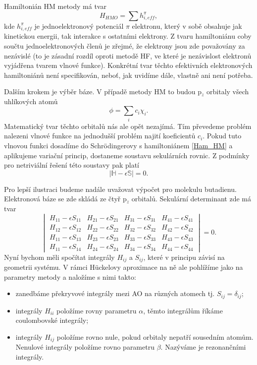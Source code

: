 Hamiltonián HM metody má tvar
\begin{equation}
H_{HMO}= \sum h_{i, eff}^\pi,
\label{rov:Ham_HM}
\end{equation}
kde $h_{i, eff}^\pi$ je jednoelektronový potenciál $\pi$ elektronu, který v sobě obsahuje jak kinetickou energii, tak interakce s ostatními elektrony.
Z tvaru hamiltoniánu coby součtu jednoelektronových členů je zřejmé, že elektrony jsou zde považovány za nezávislé (to je zásadní rozdíl oproti metodě HF, ve které je nezávislost elektronů vyjádřena  tvarem vlnové funkce). 
Konkrétní tvar těchto efektivních elektronových hamiltoniánů není specifikován, neboť, jak uvidíme dále, vlastně ani není potřeba. 

Dalším krokem je výběr báze. V případě metody HM to budou p$_z$ orbitaly všech uhlíkových atomů
\begin{equation}
\phi= \sum_i c_i \chi_i.
\label{rov:HM_MO}
\end{equation}
Matematický tvar těchto orbitalů nás ale opět nezajímá. Tím převedeme problém nalezeni vlnové funkce na jednodušší problém najití koeficientů $c_i$. Pokud tuto vlnovou funkci dosadíme do Schr\"{o}dingerovy s hamiltoniánem \eqref{Ham_HM} a aplikujeme variační princip, dostaneme soustavu sekulárních rovnic. Z podmínky pro netriviální řešení této soustavy pak platí
\begin{equation}
|\mathbb{H}-\epsilon \mathbb{S}|=0 .
\label{rov:HM_det}
\end{equation}

Pro lepší ilustraci budeme nadále uvažovat výpočet pro molekulu butadienu.
Elektronová báze se zde skládá ze čtyř p$_z$ orbitalů. Sekulární determinant zde má tvar
\begin{equation}
\begin{vmatrix}
H_{11}-\epsilon S_{11} & H_{21}-\epsilon S_{21} & H_{31}-\epsilon S_{31} & H_{41}-\epsilon S_{41}  \\
H_{12}-\epsilon S_{12} & H_{22}-\epsilon S_{22} & H_{32}-\epsilon S_{32} & H_{42}-\epsilon S_{42}  \\
H_{11}-\epsilon S_{13} & H_{23}-\epsilon S_{23} & H_{33}-\epsilon S_{33} & H_{43}-\epsilon S_{43}  \\
H_{11}-\epsilon S_{14} & H_{24}-\epsilon S_{24} & H_{34}-\epsilon S_{34} & H_{44}-\epsilon S_{44}
\end{vmatrix}
= 0 .
\end{equation}
Nyní bychom měli spočítat integrály $H_{ij}$ a $S_{ij}$, které v principu závisí na geometrii systému.
V rámci H\"{u}ckelovy aproximace na ně ale pohlížíme jako na parametry metody
a naložíme s nimi takto:
\begin{itemize}
\item zanedbáme překryvové integrály mezi AO na různých atomech tj. $S_{ij}=\delta_{ij}$;
\item integrály $H_{ii}$ položíme rovny parametru $\alpha$, těmto integrálům říkáme coulombovské integrály;
\item integrály $H_{ij}$ položíme rovno nule, pokud orbitaly nepatří sousedním atomům.
Nenulové integrály položíme rovno parametru $\beta$. Nazýváme je rezonančními integrály.
\end{itemize}

